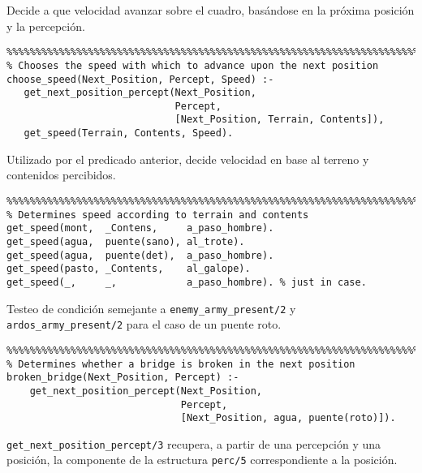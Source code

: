 \documentclass[a4paper,12pt]{report}
\begin{document}
Decide a que velocidad avanzar sobre el cuadro, bas\'{a}ndose en la pr\'{o}xima posici\'{o}n y la percepci\'{o}n.

\begin{verbatim}
%%%%%%%%%%%%%%%%%%%%%%%%%%%%%%%%%%%%%%%%%%%%%%%%%%%%%%%%%%%%%%%%%%%%%%%%%%%%%%%
% Chooses the speed with which to advance upon the next position
choose_speed(Next_Position, Percept, Speed) :-
   get_next_position_percept(Next_Position,
                             Percept,
                             [Next_Position, Terrain, Contents]),
   get_speed(Terrain, Contents, Speed).

\end{verbatim}

Utilizado por el predicado anterior, decide velocidad en base al terreno y contenidos percibidos.

\begin{verbatim}
%%%%%%%%%%%%%%%%%%%%%%%%%%%%%%%%%%%%%%%%%%%%%%%%%%%%%%%%%%%%%%%%%%%%%%%%%%%%%%%
% Determines speed according to terrain and contents
get_speed(mont,  _Contens,     a_paso_hombre).
get_speed(agua,  puente(sano), al_trote).
get_speed(agua,  puente(det),  a_paso_hombre).
get_speed(pasto, _Contents,    al_galope).
get_speed(_,     _,            a_paso_hombre). % just in case.

\end{verbatim}

Testeo de condici\'{o}n semejante a \texttt{enemy\_army\_present/2} y \texttt{ardos\_army\_present/2} para el caso de un
puente roto.

\begin{verbatim}
%%%%%%%%%%%%%%%%%%%%%%%%%%%%%%%%%%%%%%%%%%%%%%%%%%%%%%%%%%%%%%%%%%%%%%%%%%%%%%%
% Determines whether a bridge is broken in the next position
broken_bridge(Next_Position, Percept) :-
    get_next_position_percept(Next_Position,
                              Percept,
                              [Next_Position, agua, puente(roto)]).

\end{verbatim}

\texttt{get\_next\_position\_percept/3} recupera, a partir de una percepci\'{o}n y una posici\'{o}n, la componente de la
estructura \texttt{perc/5} correspondiente a la posici\'{o}n.
\end{document}
